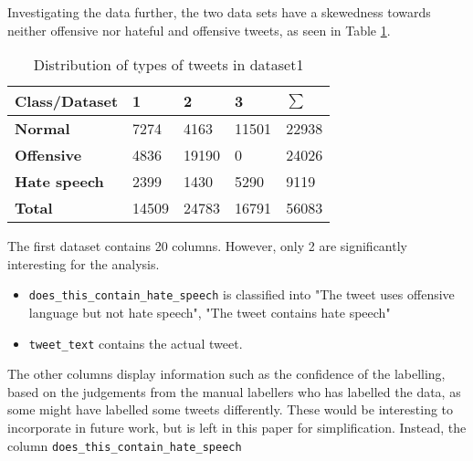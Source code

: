 \documentclass[twocolumn]{article}
\begin{document}
Investigating the data further, the two data sets have a skewedness towards neither offensive nor hateful and offensive tweets, as seen in Table \ref{tab:labeldist}. 


\begin{table}[h]
\caption{Distribution of types of tweets in dataset1}
\label{tab:labeldist}
\begin{tabular}{|l|l|l|l|l|}
\hline
\textbf{Class/Dataset} & \textbf{1} & \textbf{2} & \textbf{3} & \textbf{$\sum$} \\ \hline
\textbf{Normal}        & 7274       & 4163       & 11501       & 22938           \\ \hline
\textbf{Offensive}     & 4836       & 19190      & 0          & 24026           \\ \hline
\textbf{Hate speech}   & 2399       & 1430       & 5290       & 9119            \\ \hline
\textbf{Total}         & 14509      & 24783      & 16791      & 56083           \\ \hline
\end{tabular}
\end{table}


The first dataset contains 20 columns. However, only 2 are significantly interesting for the analysis. 
\begin{itemize}
\item \verb|does_this_contain_hate_speech| is classified into "The tweet uses offensive language but not hate speech", "The tweet contains hate speech"
\item \verb|tweet_text| contains the actual tweet.
\end{itemize}
 
The other columns display information such as the confidence of the labelling, based on the judgements from the manual labellers who has labelled the data, as some might have labelled some tweets differently. These would be interesting to incorporate in future work, but is left in this paper for simplification. Instead, the column \verb|does_this_contain_hate_speech| 
\end{document}
